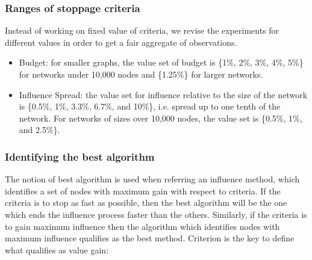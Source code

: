 			\subsubsection{Ranges of stoppage criteria}
			Instead of working on fixed value of criteria, we revise the experiments for different values in order to get a fair aggregate of observations.
			
			\begin{itemize}
				\item Budget: for smaller graphs, the value set of budget is \{1\%, 2\%, 3\%, 4\%, 5\%\} for networks under 10,000 nodes and \{1.25\%\} for larger networks.
				
				\item Influence Spread: the value set for influence relative to the size of the network is \{0.5\%, 1\%, 3.3\%, 6.7\%, and 10\%\}, i.e. spread up to one tenth of the network. For networks of sizes over 10,000 nodes, the value set is \{0.5\%, 1\%, and 2.5\%\}.
			\end{itemize}
			
			\subsubsection{Identifying the best algorithm}
			The notion of best algorithm is used when referring an influence method, which identifies a set of nodes with maximum gain with respect to criteria. If the criteria is to stop as fast as possible, then the best algorithm will be the one which ends the influence process faster than the others. Similarly, if the criteria is to gain maximum influence then the algorithm which identifies nodes with maximum influence qualifies as the best method. Criterion is the key to define what qualifies as value gain:
			
